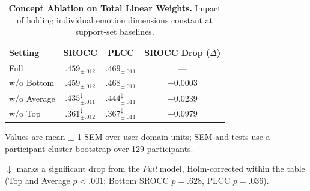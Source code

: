 \begin{table}[t]
\centering
\small
\setlength{\tabcolsep}{6pt}
\renewcommand{\arraystretch}{0.95}
\begin{threeparttable}
\caption{\textbf{Concept Ablation on Total Linear Weights.} Impact of holding individual emotion dimensions constant at support-set baselines.}
\label{tab:concept_ablation}
\begin{tabular}{l ccc}
\toprule
\textbf{Setting} & \textbf{SROCC} & \textbf{PLCC} & \textbf{SROCC Drop ($\Delta$)} \\
\midrule
Full         & $\bm{.459_{\pm .012}}$ & $\bm{.469_{\pm .011}}$ & --- \\
w/o Bottom   & $.459_{\pm .012}$ & $.468_{\pm .011}$ & $-0.0003$ \\
w/o Average  & $.435_{\pm .011}^\downarrow$ & $.444_{\pm .011}^\downarrow$ & $-0.0239$  \\
w/o Top      & $.361_{\pm .012}^\downarrow$ & $.367_{\pm .011}^\downarrow$ & $-0.0979$ \\
\bottomrule
\end{tabular}
\begin{tablenotes}[flushleft]\footnotesize
    \item Values are mean $\pm$ 1 SEM over user-domain units; SEM and tests use a participant-cluster bootstrap over 129 participants.
    \item $\downarrow$ marks a significant drop from the \emph{Full} model, Holm-corrected within the table (Top and Average $p<.001$; Bottom SROCC $p=.628$, PLCC $p=.036$).
\end{tablenotes}
\end{threeparttable}
\end{table}

